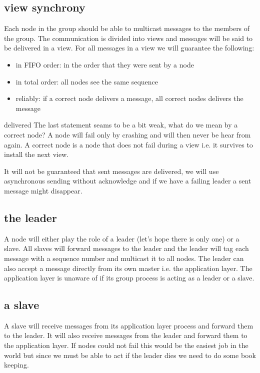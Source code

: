 \documentclass[a4paper,11pt]{article}
\begin{document}
\subsection{view synchrony}

Each node in the group should be able to multicast messages to the
members of the group. The communication is divided into views and
messages will be said to be delivered in a view. For all messages in a
view we will guarantee the following:

\begin{itemize}
\item in FIFO order: in the order that they were sent by a node
\item in total order: all nodes see the same sequence
\item reliably: if a correct node delivers a message, all correct nodes delivers the message
\end{itemize}

delivered The last statement seams to be a bit weak, what do we mean
by a correct node? A node will fail only by crashing and will then
never be hear from again. A correct node is a node that does not fail
during a view i.e. it survives to install the next view.

It will not be guaranteed that sent messages are delivered, we will
use asynchronous sending without acknowledge and if we have a
failing leader a sent message might disappear.

\subsection{the leader}

A node will either play the role of a leader (let's hope there is only
one) or a slave. All slaves will forward messages to the leader and
the leader will tag each message with a sequence number and multicast
it to all nodes. The leader can also accept a message directly from
its own master i.e. the application layer. The application layer is
unaware of if its group process is acting as a leader or a slave.


\subsection{a slave}

A slave will receive messages from its application layer process and
forward them to the leader. It will also receive messages from the
leader and forward them to the application layer. If nodes could not
fail this would be the easiest job in the world but since we must be
able to act if the leader dies we need to do some book keeping.
\end{document}
